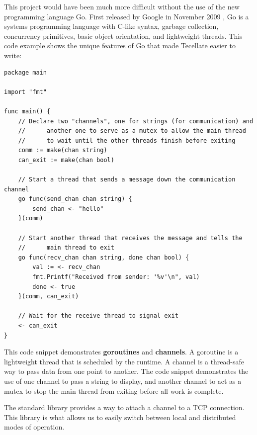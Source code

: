 This project would have been much more difficult without the use of the new programming language Go.
First released by Google in November 2009 \cite{go_new}, Go is a systems programming language with
C-like syntax, garbage collection, concurrency primitives, basic object orientation, and lightweight
threads. This code example shows the unique features of Go that made Tecellate easier to write:

\begin{tscode}
\begin{verbatim}
package main

import "fmt"

func main() {
    // Declare two "channels", one for strings (for communication) and 
    //      another one to serve as a mutex to allow the main thread 
    //      to wait until the other threads finish before exiting
    comm := make(chan string)
    can_exit := make(chan bool)
    
    // Start a thread that sends a message down the communication channel
    go func(send_chan chan string) {
        send_chan <- "hello"
    }(comm)
    
    // Start another thread that receives the message and tells the
    //      main thread to exit
    go func(recv_chan chan string, done chan bool) {
        val := <- recv_chan
        fmt.Printf("Received from sender: '%v'\n", val)
        done <- true
    }(comm, can_exit)
    
    // Wait for the receive thread to signal exit
    <- can_exit
}
\end{verbatim}
\end{tscode}

This code snippet demonstrates \textbf{goroutines} and \textbf{channels}. A goroutine is a
lightweight thread that is scheduled by the runtime. A channel is a thread-safe way to pass data
from one point to another. The code snippet demonstrates the use of one channel to pass a string to
display, and another channel to act as a mutex to stop the main thread from exiting before all work
is complete.

The standard library provides a way to attach a channel to a TCP connection. This library is what
allows us to easily switch between local and distributed modes of operation.
